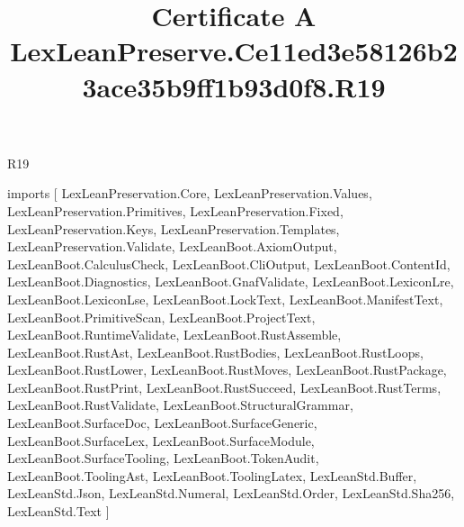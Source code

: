 \begin{lexlean}{R19}
\title{Certificate A LexLeanPreserve.Ce11ed3e58126b23ace35b9ff1b93d0f8.R19}
\begin{coremodule}
imports [
  LexLeanPreservation.Core,
  LexLeanPreservation.Values,
  LexLeanPreservation.Primitives,
  LexLeanPreservation.Fixed,
  LexLeanPreservation.Keys,
  LexLeanPreservation.Templates,
  LexLeanPreservation.Validate,
  LexLeanBoot.AxiomOutput,
  LexLeanBoot.CalculusCheck,
  LexLeanBoot.CliOutput,
  LexLeanBoot.ContentId,
  LexLeanBoot.Diagnostics,
  LexLeanBoot.GnafValidate,
  LexLeanBoot.LexiconLre,
  LexLeanBoot.LexiconLse,
  LexLeanBoot.LockText,
  LexLeanBoot.ManifestText,
  LexLeanBoot.PrimitiveScan,
  LexLeanBoot.ProjectText,
  LexLeanBoot.RuntimeValidate,
  LexLeanBoot.RustAssemble,
  LexLeanBoot.RustAst,
  LexLeanBoot.RustBodies,
  LexLeanBoot.RustLoops,
  LexLeanBoot.RustLower,
  LexLeanBoot.RustMoves,
  LexLeanBoot.RustPackage,
  LexLeanBoot.RustPrint,
  LexLeanBoot.RustSucceed,
  LexLeanBoot.RustTerms,
  LexLeanBoot.RustValidate,
  LexLeanBoot.StructuralGrammar,
  LexLeanBoot.SurfaceDoc,
  LexLeanBoot.SurfaceGeneric,
  LexLeanBoot.SurfaceLex,
  LexLeanBoot.SurfaceModule,
  LexLeanBoot.SurfaceTooling,
  LexLeanBoot.TokenAudit,
  LexLeanBoot.ToolingAst,
  LexLeanBoot.ToolingLatex,
  LexLeanStd.Buffer,
  LexLeanStd.Json,
  LexLeanStd.Numeral,
  LexLeanStd.Order,
  LexLeanStd.Sha256,
  LexLeanStd.Text
]


\end{coremodule}
\end{lexlean}
